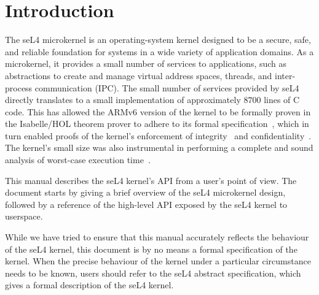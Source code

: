 %
%
%
%

\chapter{\label{ch:intro}Introduction}


The seL4 microkernel is an operating-system kernel designed to be
a secure, safe, and reliable foundation for systems in a wide variety of
application domains. As a microkernel, it provides a small number of
services to applications, such as abstractions to create and manage virtual address
spaces, threads, and inter-process communication (IPC). The small number
of services provided by seL4 directly translates to a small
implementation of approximately $8700$ lines of C code. This has allowed
the ARMv6 version of the kernel to be formally proven in the Isabelle/HOL 
theorem prover to adhere to its formal
specification~\cite{Boyton_09,Cock_KS_08,Derrin_EKCC_06,Elkaduwe_GE_08,Klein_EHACDEEKNSTW_09,Tuch_KN_07,Winwood_KSACN_09},
which in turn enabled proofs of the kernel's enforcement of
integrity~\cite{Sewell_WGMAK_11} and
confidentiality~\cite{Murray_MBGBSLGK_13}. The kernel's small size was
also instrumental in performing a complete and sound analysis of
worst-case execution time~\cite{Blackham_SCRH_11,Blackham_SH_12}.

This manual describes the seL4 kernel's API from a user's point of view.
The document starts by giving a brief overview of the seL4 microkernel
design, followed by a reference of the high-level API exposed by the
seL4 kernel to userspace.

While we have tried to ensure that this manual accurately reflects the
behaviour of the seL4 kernel, this document is by no means a formal
specification of the kernel. When the precise behaviour of the kernel
under a particular circumstance needs to be known, users should refer to
the seL4 abstract specification, which
gives a formal description of the seL4 kernel.
